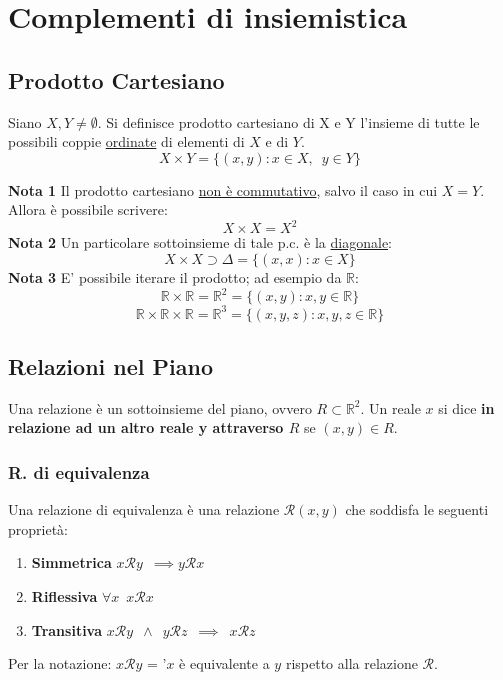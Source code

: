 \documentclass[10pt]{article}
\theoremstyle{plain}
\begin{document}
\section{Complementi di insiemistica}

\subsection{Prodotto Cartesiano}
\begin{defin}
Siano $X,Y \neq \emptyset $. Si definisce prodotto cartesiano di X e Y l'insieme di tutte le possibili coppie \underline{ordinate} di elementi di $X$ e di $Y$.
\[X \times Y = \{ (x,y) : x \in X, \enspace y \in Y\}\]
\end{defin}
\textbf{Nota 1} Il prodotto cartesiano \underline{non è commutativo}, salvo il caso in cui $X = Y$. Allora è possibile scrivere: \[X \times X = X^2\]
\textbf{Nota 2} Un particolare sottoinsieme di tale p.c. è la \underline{diagonale}: 
\[X \times X \supset \Delta = \{ (x,x) : x \in X\}\]
\textbf{Nota 3} E' possibile iterare il prodotto; ad esempio da  $\mathbb{R}$:
\[\mathbb{R} \times \mathbb{R} = \mathbb{R}^2 = \{(x,y) : x, y \in \mathbb{R}\}\]
\[\mathbb{R} \times \mathbb{R} \times \mathbb{R}= \mathbb{R}^3 = \{(x,y,z) : x, y, z \in \mathbb{R}\}\]

\subsection{Relazioni nel Piano}
\begin{defin}
Una relazione è un sottoinsieme del piano, ovvero $R \subset \mathbb{R}^2$. Un reale $x$ si dice \textbf{in relazione ad un altro reale y attraverso $R$} se $(x,y) \in R$.
\end{defin}

\subsubsection{R. di equivalenza}
\begin{defin}
Una relazione di equivalenza è una relazione $\mathcal{R}(x,y)$ che soddisfa le seguenti proprietà:
\begin{enumerate}
    \item \textbf{Simmetrica} $x\mathcal{R}y \enspace \implies y\mathcal{R}x$
    \item \textbf{Riflessiva} $\forall x \enspace x\mathcal{R}x$
    \item \textbf{Transitiva} $x\mathcal{R}y \enspace \land \enspace y\mathcal{R}z\enspace \implies \enspace x\mathcal{R}z$
\end{enumerate}
Per la notazione: $x\mathcal{R}y$ = '$x$ è equivalente a $y$ rispetto alla relazione $\mathcal{R}$.
\end{defin}
\end{document}
